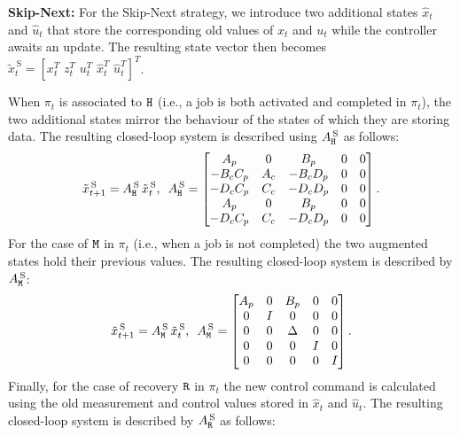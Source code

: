 \textbf{Skip-Next: }%
%
For the Skip-Next strategy, we introduce two additional states $\hat x_t$ and $\hat u_t$ that store the corresponding old values of $x_t$ and $u_t$ while the controller awaits an update.
The resulting state vector then becomes $\tilde x_t^{\,\text{S}} = \left[ x_t^T\,\,z_t^T\,\, u_t^T\,\, \hat{x}_t^T\,\, \hat{u}_t^T \right]^T$.

When $\pi_t$ is associated to $\texttt{H}$ (i.e., a job is both activated and completed in $\pi_t$), the two additional states mirror the behaviour of the states of which they are storing data.
The resulting closed-loop system is described using $A^{\,\text{S}}_{\texttt{H}}$ as follows:
\begin{equation*}
    \tilde x_{t+1}^{\,\text{S}} = A^{\,\text{S}}_{\texttt{H}}\,\tilde x_t^{\,\text{S}}, \,\,\,
    A^{\,\text{S}}_{\texttt{H}} = \begin{bmatrix}
        A_p       & 0    & B_p      & 0 & 0 \\
        -B_cC_p   & A_c  & -B_cD_p  & 0 & 0 \\
        -D_cC_p   & C_c  & -D_cD_p  & 0 & 0 \\
        A_p       & 0    & B_p      & 0 & 0 \\
        -D_cC_p   & C_c  & -D_cD_p  & 0 & 0 \\
    \end{bmatrix}.
\end{equation*}
%
For the case of $\texttt{M}$ in $\pi_t$ (i.e., when a job is not completed) the two augmented states hold their previous values. The
resulting closed-loop system is described by $A^{\,\text{S}}_{\texttt{M}}$:
%
\begin{equation*}
    \tilde x_{t+1}^{\,\text{S}} = A^{\,\text{S}}_{\texttt{M}}\,\tilde x_t^{\,\text{S}}, \,\,\,
    A^{\,\text{S}}_{\texttt{M}}=\begin{bmatrix}
        A_p & 0  & B_p & 0 & 0 \\
        0   & I  & 0   & 0 & 0 \\
        0   & 0  & \Delta   & 0 & 0 \\
        0   & 0  & 0   & I & 0 \\
        0   & 0  & 0   & 0 & I \\
	\end{bmatrix}.
\end{equation*}
%
Finally, for the case of recovery $\texttt{R}$ in $\pi_t$ the new control command is calculated using the old measurement and control values stored in $\hat x_t$ and $\hat u_t$.
The resulting closed-loop system is described by $A^{\,\text{S}}_{\texttt{R}}$ as follows:
